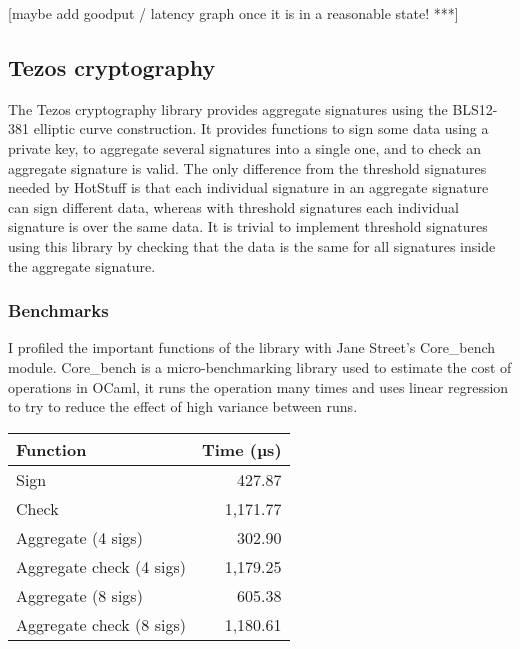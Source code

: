 [maybe add goodput / latency graph once it is in a reasonable state! ***]

\subsection{Tezos cryptography} \label{tezos}
The Tezos cryptography library provides aggregate signatures using the BLS12-381 elliptic curve construction. It provides functions to sign some data using a private key, to aggregate several signatures into a single one, and to check an aggregate signature is valid. The only difference from the threshold signatures needed by HotStuff is that each individual signature in an aggregate signature can sign different data, whereas with threshold signatures each individual signature is over the same data. It is trivial to implement threshold signatures using this library by checking that the data is the same for all signatures inside the aggregate signature.

\subsubsection{Benchmarks}
I profiled the important functions of the library with Jane Street's Core\_bench module. Core\_bench is a micro-benchmarking library used to estimate the cost of operations in OCaml, it runs the operation many times and uses linear regression to try to reduce the effect of high variance between runs.

\begin{table}[!h]
	\centering
	\begin{tabular}{|l|r|}
	\hline
	Function                 & Time (µs) \\ \hline
	Sign                     & 427.87   \\
	Check                    & 1,171.77 \\
	Aggregate (4 sigs)       & 302.90   \\
	Aggregate check (4 sigs) & 1,179.25 \\
	Aggregate (8 sigs)       & 605.38   \\
	Aggregate check (8 sigs) & 1,180.61 \\ \hline
	\end{tabular}
\end{table}

